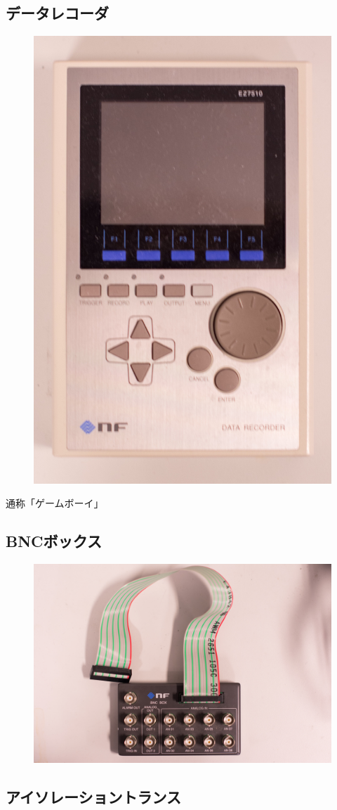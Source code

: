 \documentclass[a4j, twocolumn, openleft, uplatex, dvipdfmx]{jsbook}
\begin{document}
        \subsection*{データレコーダ}
            \begin{figure}[H]
                \centering
                \includegraphics[width=0.5\linewidth]{./figure/nf.jpg}
            \end{figure}
            通称「ゲームボーイ」
        \subsection*{BNCボックス}
            \begin{figure}[H]
                \centering
                \includegraphics[width=0.6\linewidth]{./figure/bncbox.jpg}
            \end{figure}
        \subsection*{アイソレーショントランス}
\end{document}
